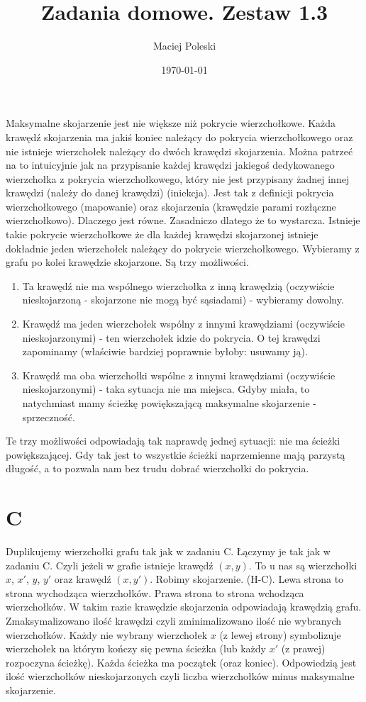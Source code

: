 \documentclass[a4paper,12pt]{article}
\title{Zadania domowe. Zestaw 1.3}
\author{Maciej Poleski}
\date{\today}
\begin{document}
\maketitle

\newpage

\section{}
Maksymalne skojarzenie jest nie większe niż pokrycie wierzchołkowe. Każda krawędź skojarzenia ma jakiś koniec należący do pokrycia wierzchołkowego oraz nie istnieje wierzchołek należący do dwóch krawędzi skojarzenia. Można patrzeć na to intuicyjnie jak na przypisanie każdej krawędzi jakiegoś dedykowanego wierzchołka z pokrycia wierzchołkowego, który nie jest przypisany żadnej innej krawędzi (należy do danej krawędzi) (iniekcja). Jest tak z definicji pokrycia wierzchołkowego (mapowanie) oraz skojarzenia (krawędzie parami rozłączne wierzchołkowo). Dlaczego jest równe. Zasadniczo dlatego że to wystarcza. Istnieje takie pokrycie wierzchołkowe że dla każdej krawędzi skojarzonej istnieje dokładnie jeden wierzchołek należący do pokrycie wierzchołkowego. Wybieramy z grafu po kolei krawędzie skojarzone. Są trzy możliwości.
\begin{enumerate}
 \item Ta krawędź nie ma wspólnego wierzchołka z inną krawędzią (oczywiście nieskojarzoną - skojarzone nie mogą być sąsiadami) - wybieramy dowolny.
 \item Krawędź ma jeden wierzchołek wspólny z innymi krawędziami (oczywiście nieskojarzonymi) - ten wierzchołek idzie do pokrycia. O tej krawędzi zapominamy (właściwie bardziej poprawnie byłoby: usuwamy ją).
 \item Krawędź ma oba wierzchołki wspólne z innymi krawędziami (oczywiście nieskojarzonymi) - taka sytuacja nie ma miejsca. Gdyby miała, to natychmiast mamy ścieżkę powiększającą maksymalne skojarzenie - sprzeczność.
\end{enumerate}
Te trzy możliwości odpowiadają tak naprawdę jednej sytuacji: nie ma ścieżki powiększającej. Gdy tak jest to wszystkie ścieżki naprzemienne mają parzystą długość, a to pozwala nam bez trudu dobrać wierzchołki do pokrycia.
 
\section{C}
Duplikujemy wierzchołki grafu tak jak w zadaniu C. Łączymy je tak jak w zadaniu C. Czyli jeżeli w grafie istnieje krawędź $(x,y)$. To u nas są wierzchołki $x$, $x'$, $y$, $y'$ oraz krawędź $(x,y')$.
Robimy skojarzenie. (H-C). Lewa strona to strona wychodząca wierzchołków. Prawa strona to strona wchodząca wierzchołków. W takim razie krawędzie skojarzenia odpowiadają krawędzią grafu. Zmaksymalizowano ilość krawędzi czyli zminimalizowano ilość nie wybranych wierzchołków. Każdy nie wybrany wierzchołek $x$ (z lewej strony) symbolizuje wierzchołek na którym kończy się pewna ścieżka (lub każdy $x'$ (z prawej) rozpoczyna ścieżkę). Każda ścieżka ma początek (oraz koniec). Odpowiedzią jest ilość wierzchołków nieskojarzonych czyli liczba wierzchołków minus maksymalne skojarzenie.
\section{}
\end{document}
